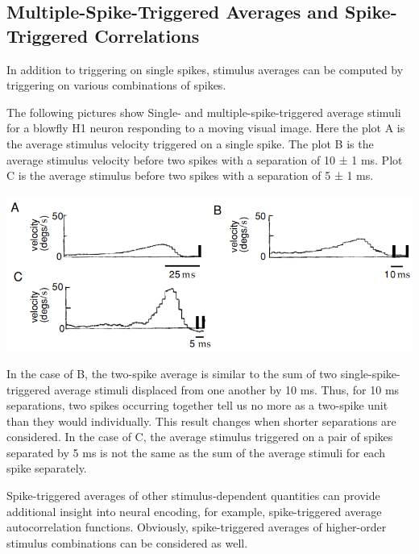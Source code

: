 \subsection{Multiple-Spike-Triggered Averages and Spike-Triggered Correlations}
\begin{rem}
  In addition to triggering on single spikes, stimulus averages can be computed by triggering on various combinations of spikes.
\end{rem}
\begin{exm}
  The following pictures show Single- and multiple-spike-triggered average stimuli for a blowfly H1 neuron responding to a moving visual image. Here the plot A is the average stimulus velocity triggered on a single spike. The plot B is the average stimulus velocity before two spikes with a separation of 10 ± 1 ms. Plot C is the average stimulus before two spikes with a separation of 5 ± 1 ms.
  \begin{center}
    \includegraphics[scale=0.3]{./png/1.10-blowflyH1neuron.png}
    \label{fig:1.10}    
  \end{center}
  In the case of B, the two-spike average is similar to the sum of two single-spike-triggered average stimuli displaced from one another by 10 ms. Thus, for 10 ms separations, two spikes occurring together tell us no more as a two-spike unit than they would individually. This result changes when shorter separations are considered. In the case of C, the average stimulus triggered on a pair of spikes separated by 5 ms is not the same as the sum of the average stimuli for each spike separately.
\end{exm}


\begin{rem}
  Spike-triggered averages of other stimulus-dependent quantities can provide additional insight into neural encoding, for example, spike-triggered average autocorrelation functions. Obviously, spike-triggered averages of higher-order stimulus combinations can be considered as well.
\end{rem}

